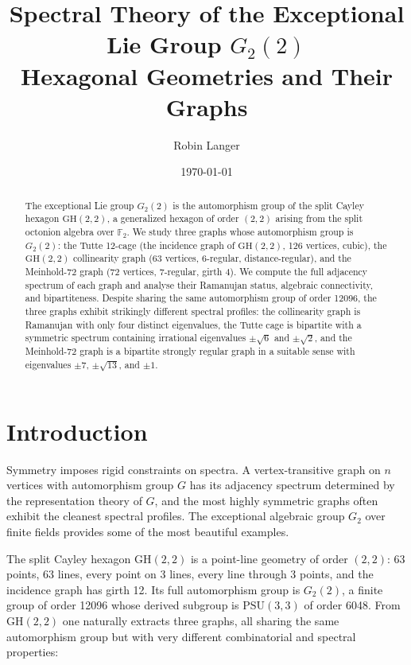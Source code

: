 \documentclass[11pt,a4paper]{article}
\title{\textbf{Spectral Theory of the Exceptional Lie Group $G_2(2)$}\\
\large Hexagonal Geometries and Their Graphs}
\author{Robin Langer}
\date{\today}
\theoremstyle{plain}
\theoremstyle{definition}
\theoremstyle{remark}
\newcommand{\GH}{\mathrm{GH}(2,2)}
\newcommand{\Gtwo}{G_2(2)}
\newcommand{\PSU}{\mathrm{PSU}(3,3)}
\begin{document}
\maketitle

\begin{abstract}
The exceptional Lie group $G_2(2)$ is the automorphism group of the split Cayley hexagon
$\mathrm{GH}(2,2)$, a generalized hexagon of order $(2,2)$ arising from the split octonion
algebra over $\mathbb{F}_2$.  We study three graphs whose automorphism group is $G_2(2)$:
the Tutte 12-cage (the incidence graph of $\mathrm{GH}(2,2)$, 126 vertices, cubic),
the $\mathrm{GH}(2,2)$ collinearity graph (63 vertices, 6-regular, distance-regular),
and the Meinhold-72 graph (72 vertices, 7-regular, girth 4).
We compute the full adjacency spectrum of each graph and analyse their Ramanujan status,
algebraic connectivity, and bipartiteness.  Despite sharing the same automorphism group of
order 12096, the three graphs exhibit strikingly different spectral profiles: the collinearity
graph is Ramanujan with only four distinct eigenvalues, the Tutte cage is bipartite with a
symmetric spectrum containing irrational eigenvalues $\pm\sqrt{6}$ and $\pm\sqrt{2}$,
and the Meinhold-72 graph is a bipartite strongly regular graph in a suitable sense with
eigenvalues $\pm 7$, $\pm\sqrt{13}$, and $\pm 1$.
\end{abstract}

\tableofcontents

\section{Introduction}

Symmetry imposes rigid constraints on spectra.  A vertex-transitive graph on $n$ vertices
with automorphism group $G$ has its adjacency spectrum determined by the representation
theory of $G$, and the most highly symmetric graphs often exhibit the cleanest spectral
profiles.  The exceptional algebraic group $G_2$ over finite fields provides some of the
most beautiful examples.

The split Cayley hexagon $\GH$ is a point-line geometry of order $(2,2)$: 63 points,
63 lines, every point on 3 lines, every line through 3 points, and the incidence graph
has girth 12.  Its full automorphism group is $\Gtwo$, a finite group of order 12096
whose derived subgroup is $\PSU$ of order 6048.  From $\GH$ one naturally extracts
three graphs, all sharing the same automorphism group but with very different combinatorial
and spectral properties:
\end{document}
